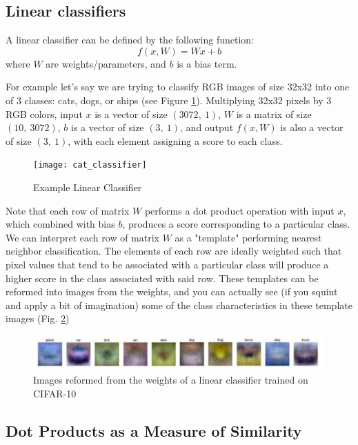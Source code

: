 \documentclass[twoside]{article}
\begin{document}
\subsection{Linear classifiers}

A linear classifier can be defined by the following function:
$$f(x, W) = W x + b $$
where $W$ are weights/parameters, and $b$ is a bias term.

For example let's say we are trying to classify RGB images of size 32x32 into one of 3 classes: cats, dogs, or ships (see Figure \ref{fig:cat_classifier}). Multiplying 32x32 pixels by 3 RGB colors, input $x$ is a vector of size $(3072,\ 1)$, $W$ is a matrix of size $(10,\ 3072)$, $b$ is a vector of size $(3,\ 1)$, and output $f(x, W)$ is also a vector of size $(3,\ 1)$, with each element assigning a score to each class.

\begin{figure}[!ht]%
    \centering
    \texttt{[image: cat\_classifier]}
    \caption{Example Linear Classifier}
    \label{fig:cat_classifier}%
\end{figure}

Note that each row of matrix $W$ performs a dot product operation with input $x$, which combined with bias $b$, produces a score corresponding to a particular class. We can interpret each row of matrix $W$ as a "template" performing nearest neighbor classification. The elements of each row are ideally weighted such that pixel values that tend to be associated with a particular class will produce a higher score in the class associated with said row. These templates can be reformed into images from the weights, and you can actually see (if you squint and apply a bit of imagination) some of the class characteristics in these template images (Fig. \ref{fig:weight_images})

\begin{figure}[!ht]%
    \centering
    \includegraphics[width=14cm]{reformed_weight_images}
    \caption{Images reformed from the weights of a linear classifier trained on CIFAR-10}
    \label{fig:weight_images}%
\end{figure}

\subsection{Dot Products as a Measure of Similarity}
\end{document}
